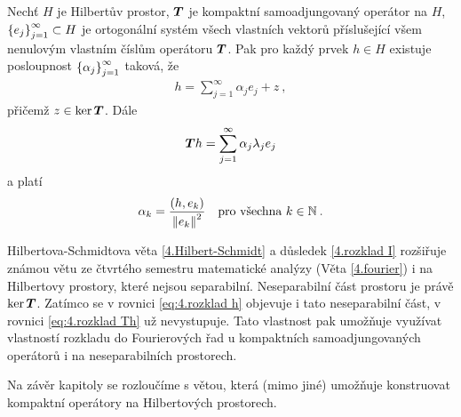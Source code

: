 \begin{corollary} \label{4.rozklad I}
Nechť $H$ je Hilbertův prostor, $\boldsymbol{T}$ je kompaktní samoadjungovaný operátor na $H$, $\left \lbrace e_j \right \rbrace_{j=1}^\infty \subset H$ je ortogonální systém všech vlastních vektorů příslušející všem nenulovým vlastním číslům operátoru $\boldsymbol{T}$. Pak pro každý prvek $h \in H$ existuje posloupnost $\left \lbrace \alpha_j \right \rbrace_{j=1}^\infty$ taková, že \begin{align} \label{eq:4.rozklad h}
    h = \sum_{j=1}^\infty \alpha_j e_j + z \:,
\end{align}
přičemž $z \in \mathrm{ker}\, \boldsymbol{T}$. Dále \begin{align} \label{eq:4.rozklad Th}
    \boldsymbol{T} h = \sum_{j=1}^\infty \alpha_j \lambda_j e_j
\end{align}
a platí \begin{align*}
    \alpha_k = \dfrac{(h, e_k)}{\left\lVert e_k\right\rVert^2} \quad \text{pro všechna } k \in \mathbb{N} \:.
\end{align*}
\end{corollary}

\begin{remark}
Hilbertova-Schmidtova věta \ref{4.Hilbert-Schmidt} a důsledek \ref{4.rozklad I} rozšiřuje známou větu ze čtvrtého semestru matematické analýzy (Věta \ref{4.fourier}) i na Hilbertovy prostory, které nejsou separabilní. Neseparabilní část prostoru je právě $\mathrm{ker}\, \boldsymbol{T}$. Zatímco se v rovnici \eqref{eq:4.rozklad h} objevuje i tato neseparabilní část, v rovnici \eqref{eq:4.rozklad Th} už nevystupuje. Tato vlastnost pak umožňuje využívat vlastností rozkladu do Fourierových řad u kompaktních samoadjungovaných operátorů i na neseparabilních prostorech.
\end{remark}

Na závěr kapitoly se rozloučíme s větou, která (mimo jiné) umožňuje konstruovat kompaktní operátory na Hilbertových prostorech.

